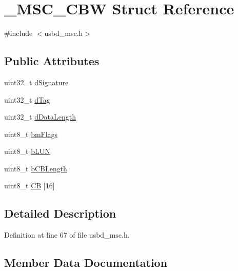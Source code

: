 \hypertarget{struct___m_s_c___c_b_w}{}\section{\+\_\+\+M\+S\+C\+\_\+\+C\+BW Struct Reference}
\label{struct___m_s_c___c_b_w}


{\ttfamily \#include $<$usbd\+\_\+msc.\+h$>$}

\subsection*{Public Attributes}
\begin{DoxyCompactItemize}
\item 
uint32\+\_\+t \hyperlink{struct___m_s_c___c_b_w_a1fa625c9bfe68afb30fe973585627c38}{d\+Signature}
\item 
uint32\+\_\+t \hyperlink{struct___m_s_c___c_b_w_a2bc3d8d87456e730b569f155a013fbda}{d\+Tag}
\item 
uint32\+\_\+t \hyperlink{struct___m_s_c___c_b_w_af35538f5f1b08d48b3f11f5cb3c858ca}{d\+Data\+Length}
\item 
uint8\+\_\+t \hyperlink{struct___m_s_c___c_b_w_a57c100a025722a6f5a30c49035e5a23f}{bm\+Flags}
\item 
uint8\+\_\+t \hyperlink{struct___m_s_c___c_b_w_aa6b62e68b9e2b63792ab904e2f090107}{b\+L\+UN}
\item 
uint8\+\_\+t \hyperlink{struct___m_s_c___c_b_w_a2b867486ab4560cb4a6af62289415400}{b\+C\+B\+Length}
\item 
uint8\+\_\+t \hyperlink{struct___m_s_c___c_b_w_a9a89704eaaa2b7079085ecd40a908fe7}{CB} \mbox{[}16\mbox{]}
\end{DoxyCompactItemize}


\subsection{Detailed Description}


Definition at line 67 of file usbd\+\_\+msc.\+h.



\subsection{Member Data Documentation}
\mbox{\label{struct___m_s_c___c_b_w_a2b867486ab4560cb4a6af62289415400}} 
